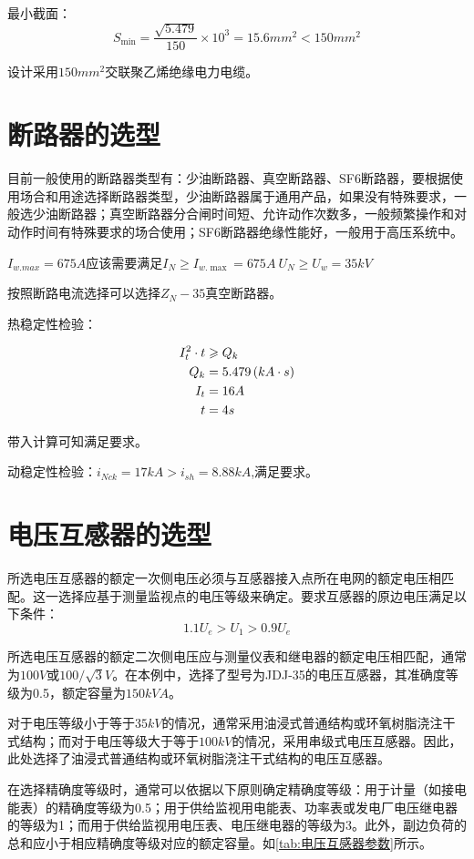 最小截面：
$$
S_{\min}=\frac{\sqrt{5.479}}{150}\times 10^3=15.6mm^2<150mm^2
$$

设计采用$150mm^2$交联聚乙烯绝缘电力电缆。
\section{断路器的选型}
目前一般使用的断路器类型有：少油断路器、真空断路器、SF6断路器，要根据使用场合和用途选择断路器类型，少油断路器属于通用产品，如果没有特殊要求，一般选少油断路器；真空断路器分合闸时间短、允许动作次数多，一般频繁操作和对动作时间有特殊要求的场合使用；SF6断路器绝缘性能好，一般用于高压系统中。

$I_{w.max}=675A$应该需要满足$I_N\geqslant I_{w.\max}=675A\ U_N\geqslant U_{w}=35kV$

按照断路电流选择可以选择$Z_N-35$真空断路器。

热稳定性检验：

\begin{align}
		I_{t}^{2}\cdot t&\geqslant Q_k\notag
		\\
		Q_k&=5.479\left( kA\cdot s \right) \notag
		\\
		I_t&=16A\notag
		\\
		t&=4s\notag
\end{align}

带入计算可知满足要求。

动稳定性检验：$i_{Nck}=17kA>i_{sh}=8.88kA$,满足要求。
\section{电压互感器的选型}
所选电压互感器的额定一次侧电压必须与互感器接入点所在电网的额定电压相匹配。这一选择应基于测量监视点的电压等级来确定。要求互感器的原边电压满足以下条件：
$$1.1U_e>U_1>0.9U_e$$

所选电压互感器的额定二次侧电压应与测量仪表和继电器的额定电压相匹配，通常为$100V$或$100/\sqrt{3}V$。在本例中，选择了型号为JDJ-35的电压互感器，其准确度等级为0.5，额定容量为$150kVA$。

对于电压等级小于等于$35kV$的情况，通常采用油浸式普通结构或环氧树脂浇注干式结构；而对于电压等级大于等于$100kV$的情况，采用串级式电压互感器。因此，此处选择了油浸式普通结构或环氧树脂浇注干式结构的电压互感器。

在选择精确度等级时，通常可以依据以下原则确定精确度等级：用于计量（如接电能表）的精确度等级为0.5；用于供给监视用电能表、功率表或发电厂电压继电器的等级为1；而用于供给监视用电压表、电压继电器的等级为3。此外，副边负荷的总和应小于相应精确度等级对应的额定容量。如\ref{tab:电压互感器参数}所示。

